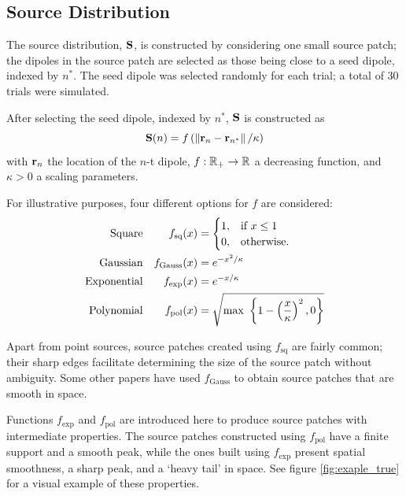 
\subsection{Source Distribution}

The source distribution, $\mathbf{S}$, is constructed by considering one small source patch; the dipoles in the source patch are selected as those being close to a seed dipole, indexed by $n^*$.
%
The seed dipole was selected randomly for each trial; a total of 30 trials were simulated.

After selecting the seed dipole, indexed by $n^*$, $\mathbf{S}$ is constructed as
\begin{equation}
\mathbf{S}(n) = f\left(  \left\lVert \mathbf{r}_n-\mathbf{r}_{n^*} \right\rVert / \kappa  \right)
\end{equation}
with $\mathbf{r}_n$ the location of the $n$-t dipole, $f:\mathbb{R}_+\rightarrow \mathbb{R}$ a decreasing function, and $\kappa>0$ a scaling parameters.

For illustrative purposes, four different options for $f$ are considered:
\begin{align}
\text{Square} &&
    f_\text{sq}(x) 
    &= 
    \begin{cases}
1, &\text{if } x\leq 1 \\
0, &\text{otherwise}.
\end{cases}
    \\
\text{Gaussian} &&
    f_\text{Gauss}(x) 
    &= 
    e^{-x^2/\kappa}
    \\
\text{Exponential} &&
    f_\text{exp}(x) 
    &= 
    e^{-x/\kappa}
    \\
\text{Polynomial} &&
    f_\text{pol}(x) 
    &= 
    \sqrt{ \max\,\, \left\{ 1-\left( \frac{x}{\kappa} \right)^2, 0  \right\}}
\end{align}

%
Apart from point sources, source patches created using $f_\text{sq}$ are fairly common; their sharp edges facilitate determining the size of the source patch without ambiguity.
%
Some other papers have used $f_\text{Gauss}$ to obtain source patches that are smooth in space. 

Functions $f_\text{exp}$ and $f_\text{pol}$ are introduced here to produce source patches with intermediate properties.
%
The source patches constructed using $f_\text{pol}$ have a finite support and a smooth peak, while the ones built using $f_\text{exp}$ present spatial smoothness, a sharp peak, and a `heavy tail' in space.
%
See figure \ref{fig:exaple_true} for a visual example of these properties.

